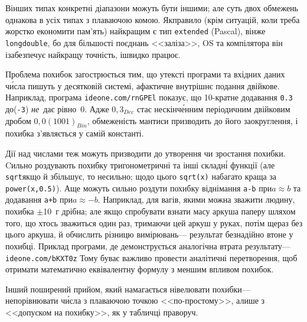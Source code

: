 В\nolinebreak[3] інших типах конкретні діапазони можуть бути іншими; але суть двох обмежень однакова в усіх типах з плаваючою комою. 
Як\nolinebreak[3] правило (крім ситуацій, коли треба жорстко економити пам'ять) найкращим є тип \texttt{extended} (Pascal), він\nolinebreak[3] же \texttt{long\nolinebreak[2] double}, бо для більшості поєднань <<заліза>>, OS та компілятора він і\nolinebreak[3] забезпечує найкращу точність, і\nolinebreak[3] швидко працює. 

Проблема похибок загострюється тим, що у\nolinebreak[3] тексті програми та вхідних даних ч\'{и}сла пишуть у десятковій системі, а\nolinebreak[2] фактичне внутрішнє подання двійкове. 
Наприклад, програма \verb"ideone.com/rnGPEl" показує, що 10-\nolinebreak[2]кратне додавання \texttt{0.3} до\nolinebreak[2] (\texttt{-3}) \emph{не}~дає рівно~0. Адже $0{,}3_{Dec}$ стає нескін\-ч\'{е}н\-ним періодичним двійковим дробом $0{,}0(1001)_{Bin}$, обмеженість мантиси призводить до його заокруглення, і похибка з'являється у самій константі.\label{text:floating-point-error-in-0.3}

Дії над числами теж можуть призводити до утворення чи зростання похибки. Cильно роздувають похибку тригонометричні та інші складн\'{і} функції (але \verb"sqrt"\nolinebreak[1] якщо й збільшує, то не\nolinebreak[3] сильно; щодо цього \verb"sqrt(x)" набагато краща за \verb"power(x,0.5)"). А\nolinebreak[3] ще можуть сильно роздути похибку віднімання \verb"a-b" при\nolinebreak[2] ${a{\approx}b}$ та додавання \verb"a+b" при\nolinebreak[3] ${a{\approx}{-}b}$. Наприклад, для вагів, якими можна зважити людину, похибка $\pm$10~г дрібна; але якщо спробувати взнати масу аркуша паперу шляхом того, що хтось зважиться один раз, тримаючи цей аркуш у руках, потім ще\nolinebreak[3] раз без цього аркуша, й обчислить різницю вимірювань\nolinebreak[3] --- результат безнадійно втоне у похибці.
Приклад програми, де демонструється аналогічна втрата результату\nolinebreak[3] --- \verb"ideone.com/bKXT0z"\hspace{0.5em plus 1em}
Тому буває важливо провести аналітичні перетворення, щоб отримати математично еквівалентну формулу з меншим впливом похибок. 

Інший поширений прийом, який намагається нівелювати похибки\nolinebreak[3] --- не\nolinebreak[2] порівнювати ч\'{и}сла з плаваючою точкою <<по-простому>>, а\nolinebreak[3] лише з <<допуском на похибку>>, як у табличці праворуч.

